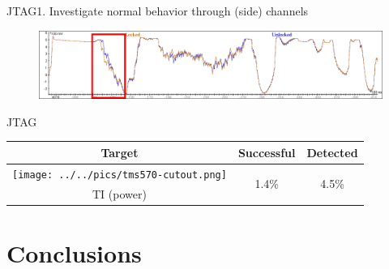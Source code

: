 \documentclass[table]{beamer}
\begin{document}
\begin{frame}{JTAG}{1. Investigate normal behavior through (side) channels }
    \begin{figure}[H]
      \centering
      \includegraphics[width=\textwidth]{../plots/tms57-trace2-2.png}
    \end{figure}
\end{frame}

\begin{frame}{JTAG}
    \begin{table}[H]
          \centering
          \begin{tabular}{c c c}
          \toprule
            \cellcolor{white!100} Target & Successful & Detected \\
            \midrule
            \texttt{[image: ../../pics/tms570-cutout.png]} & \multirow{ 2}{*}{1.4\%} & \multirow{ 2}{*}{4.5\%} \\ TI (power) & &\\
          \bottomrule
          \end{tabular}
    \end{table}
\end{frame}

\section{Conclusions\ \ }

\begin{frame}
    \tableofcontents[currentsection]
\end{frame}
\end{document}
